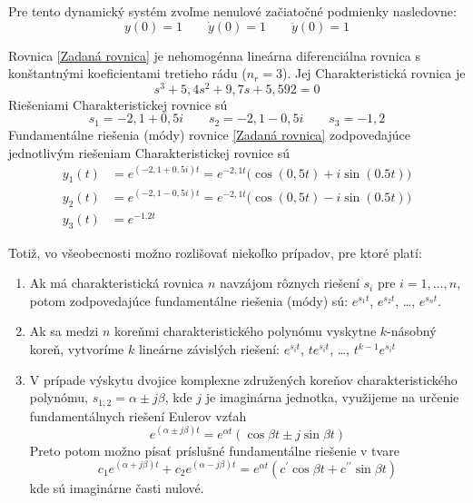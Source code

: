 \documentclass[a4paper, 10pt, ]{article}
\begin{document}
\noindent
Pre tento dynamický systém zvoľme nenulové začiatočné podmienky nasledovne:
\begin{equation*}
		y(0) = 1 \qquad \dot{y}(0)  = 1 \qquad 	\ddot{y}(0) = 1
\end{equation*}



\bigskip


\noindent
Rovnica \eqref{Zadaná rovnica} je nehomogénna lineárna diferenciálna rovnica s konštantnými koeficientami tretieho rádu ($n_r = 3$). Jej Charakteristická rovnica je
\begin{equation}
	s^3 + 5,4 s^2 + 9,7 s + 5,592 = 0
\end{equation}
Riešeniami Charakteristickej rovnice sú
\begin{equation} \label{Korene CHR}
		s_1 = -2,1 + 0,5i \qquad
		s_2 = -2,1 - 0,5i \qquad
		s_3 = -1,2
\end{equation}
Fundamentálne riešenia (módy) rovnice \eqref{Zadaná rovnica} zodpovedajúce jednotlivým riešeniam Charakteristickej rovnice sú
\begin{subequations}
	\begin{align}
		y_1(t) &= e^{(-2,1 + 0,5i)t} = e^{-2,1t} \big({ \cos(0,5t) + i\sin(0.5t) }\big) \\
		y_2(t) &= e^{(-2,1 - 0,5i)t} = e^{-2,1t} \big({ \cos(0,5t) - i\sin(0.5t) }\big) \\
		y_3(t) &= e^{-1.2t}
	\end{align}
\end{subequations}



Totiž, vo všeobecnosti možno rozlišovať niekoľko prípadov, pre ktoré platí:
\begin{enumerate}[leftmargin=0pt, labelsep=4mm, itemsep=0pt]
    \item Ak má charakteristická rovnica $n$ navzájom rôznych riešení $s_i$ pre $i = 1, \ldots, n$, potom zodpovedajúce fundamentálne riešenia (módy) sú: $e^{s_1 t}$, $e^{s_2 t}$, \ldots, $e^{s_n t}$.
    \item Ak sa medzi $n$ koreňmi charakteristického polynómu vyskytne $k$-násobný koreň, vytvoríme $k$ lineárne závislých riešení: $e^{s_i t}$, $t e^{s_i t}$, \ldots, $t^{k-1} e^{s_i t}$
    \item V prípade výskytu dvojice komplexne združených koreňov charakteristického polynómu, $s_{1,2} = \alpha \pm j \beta$, kde $j$ je imaginárna jednotka, využijeme na určenie fundamentálnych riešení Eulerov vzťah
    \begin{equation}
        e^{\left(\alpha \pm j \beta\right)t} = e^{\alpha t} \left( \cos\beta t \pm j \sin \beta t\right)
    \end{equation}
    Preto potom možno písať príslušné fundamentálne riešenie v tvare
    \begin{equation}
        c_1 e^{\left(\alpha + j \beta\right)t} + c_2 e^{\left(\alpha - j \beta\right)t} = e^{\alpha t} \left( c^\prime \cos\beta t + c^{\prime\prime} \sin \beta t\right)
    \end{equation}
    kde sú imaginárne časti nulové.
\end{enumerate}
\end{document}
